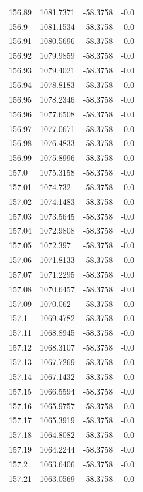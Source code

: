 \begin{table}[H]
\begin{tabular}{llll}
156.89 & 1081.7371 & -58.3758 & -0.0 \\
156.9 & 1081.1534 & -58.3758 & -0.0 \\
156.91 & 1080.5696 & -58.3758 & -0.0 \\
156.92 & 1079.9859 & -58.3758 & -0.0 \\
156.93 & 1079.4021 & -58.3758 & -0.0 \\
156.94 & 1078.8183 & -58.3758 & -0.0 \\
156.95 & 1078.2346 & -58.3758 & -0.0 \\
156.96 & 1077.6508 & -58.3758 & -0.0 \\
156.97 & 1077.0671 & -58.3758 & -0.0 \\
156.98 & 1076.4833 & -58.3758 & -0.0 \\
156.99 & 1075.8996 & -58.3758 & -0.0 \\
157.0 & 1075.3158 & -58.3758 & -0.0 \\
157.01 & 1074.732 & -58.3758 & -0.0 \\
157.02 & 1074.1483 & -58.3758 & -0.0 \\
157.03 & 1073.5645 & -58.3758 & -0.0 \\
157.04 & 1072.9808 & -58.3758 & -0.0 \\
157.05 & 1072.397 & -58.3758 & -0.0 \\
157.06 & 1071.8133 & -58.3758 & -0.0 \\
157.07 & 1071.2295 & -58.3758 & -0.0 \\
157.08 & 1070.6457 & -58.3758 & -0.0 \\
157.09 & 1070.062 & -58.3758 & -0.0 \\
157.1 & 1069.4782 & -58.3758 & -0.0 \\
157.11 & 1068.8945 & -58.3758 & -0.0 \\
157.12 & 1068.3107 & -58.3758 & -0.0 \\
157.13 & 1067.7269 & -58.3758 & -0.0 \\
157.14 & 1067.1432 & -58.3758 & -0.0 \\
157.15 & 1066.5594 & -58.3758 & -0.0 \\
157.16 & 1065.9757 & -58.3758 & -0.0 \\
157.17 & 1065.3919 & -58.3758 & -0.0 \\
157.18 & 1064.8082 & -58.3758 & -0.0 \\
157.19 & 1064.2244 & -58.3758 & -0.0 \\
157.2 & 1063.6406 & -58.3758 & -0.0 \\
157.21 & 1063.0569 & -58.3758 & -0.0 \\

\end{tabular}
\end{table}
